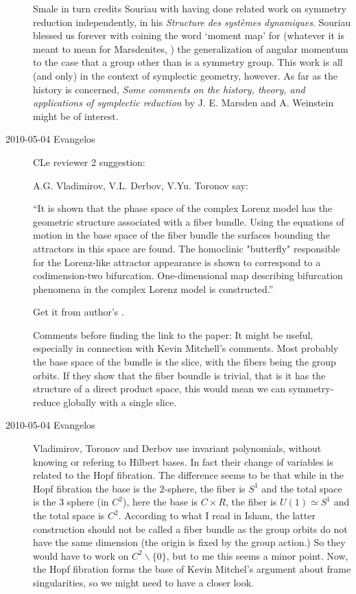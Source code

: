 \begin{description}
Smale in turn credits Souriau with having done related
work on symmetry reduction independently, in his
{\emph{Structure}} \emph{des syst\`emes dynamiques}. Souriau blessed us forever with
coining the word `moment map' for (whatever it is meant to mean for Marsdenites,
\ie)
the generalization of angular momentum to the case that a group other than
{} is a symmetry group.
This work is all (and only) in the
context of symplectic geometry, however. As far as the history is concerned,
{\emph{Some comments}} \emph{on the history, theory, and applications of
symplectic reduction} by J. E. Marsden and A. Weinstein
might be of interest.

\item[2010-05-04 Evangelos] CLe reviewer 2 suggestion:

A.G. Vladimirov, V.L. Derbov, V.Yu. Toronov
say:

``It is shown that the phase space of the complex Lorenz
model has the geometric structure associated with a fiber
bundle. Using the equations of motion in the base space of
the fiber bundle the surfaces bounding the attractors in this
space are found. The homoclinic "butterfly" responsible for
the Lorenz-like attractor appearance is shown to correspond
to a codimension-two bifurcation. One-dimensional map
describing bifurcation phenomena in the complex Lorenz model
is constructed.''

Get it from author's
.

Comments before finding the link to the paper: It might be
useful, especially in connection with Kevin Mitchell's
comments. Most probably the base space of the bundle is the
slice, with the fibers being the group orbits. If they show
that the fiber boundle is trivial, that is it has the
structure of a direct product space, this would mean
we can symmetry-reduce globally with a single slice.

\item[2010-05-04 Evangelos] Vladimirov, Toronov and
Derbov use invariant polynomials, without knowing or
refering to Hilbert bases. In fact their change of variables is related
to the Hopf fibration. The difference seems to be that while in the Hopf
fibration the base is the $2$-sphere, the fiber is $S^1$ and the total
space is the $3$ sphere (in $C^2$), here the base is $C\times R$, the
fiber is $U(1)\simeq S^1$ and the total space is $C^2$. According to what
I read in Isham, the latter construction should not be called
a fiber bundle as the group orbits do not have the same dimension (the
origin is fixed by the group action.) So they would have to work on
$C^2\backslash \{0\}$, but to me this seems a minor point. Now, the Hopf
fibration forms the base of Kevin Mitchel's argument about frame
singularities, so we might need to have a closer look.


\end{description}

